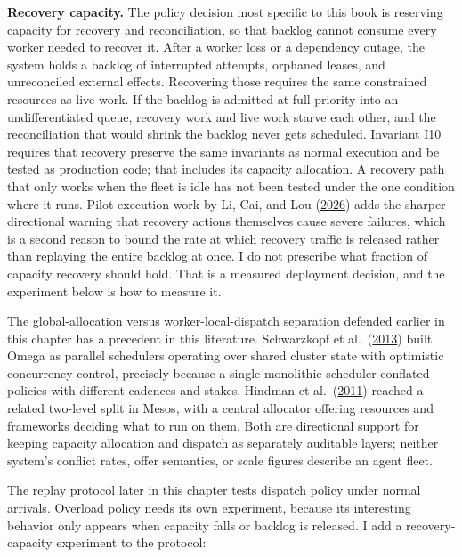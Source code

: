 \textbf{Recovery capacity.} The policy decision most specific to this book is reserving capacity for recovery and reconciliation, so that backlog cannot consume every worker needed to recover it. After a worker loss or a dependency outage, the system holds a backlog of interrupted attempts, orphaned leases, and unreconciled external effects. Recovering those requires the same constrained resources as live work. If the backlog is admitted at full priority into an undifferentiated queue, recovery work and live work starve each other, and the reconciliation that would shrink the backlog never gets scheduled. Invariant I10 requires that recovery preserve the same invariants as normal execution and be tested as production code; that includes its capacity allocation. A recovery path that only works when the fleet is idle has not been tested under the one condition where it runs. Pilot-execution work by Li, Cai, and Lou (\href{https://www.usenix.org/conference/nsdi26/presentation/li-zhenyu}{2026}) adds the sharper directional warning that recovery actions themselves cause severe failures, which is a second reason to bound the rate at which recovery traffic is released rather than replaying the entire backlog at once. I do not prescribe what fraction of capacity recovery should hold. That is a measured deployment decision, and the experiment below is how to measure it.

The global-allocation versus worker-local-dispatch separation defended earlier in this chapter has a precedent in this literature. Schwarzkopf et al.~(\href{https://research.google/pubs/omega-flexible-scalable-schedulers-for-large-compute-clusters/}{2013}) built Omega as parallel schedulers operating over shared cluster state with optimistic concurrency control, precisely because a single monolithic scheduler conflated policies with different cadences and stakes. Hindman et al.~(\href{https://www.usenix.org/conference/nsdi11/mesos-platform-fine-grained-resource-sharing-data-center}{2011}) reached a related two-level split in Mesos, with a central allocator offering resources and frameworks deciding what to run on them. Both are directional support for keeping capacity allocation and dispatch as separately auditable layers; neither system's conflict rates, offer semantics, or scale figures describe an agent fleet.


The replay protocol later in this chapter tests dispatch policy under normal arrivals. Overload policy needs its own experiment, because its interesting behavior only appears when capacity falls or backlog is released. I add a recovery-capacity experiment to the protocol:

